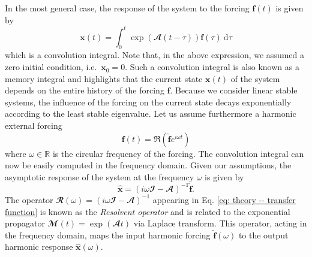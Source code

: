     In the most general case, the response of the system to the forcing $\mathbf{f}(t)$ is given by
    \begin{equation}
      \mathbf{x}(t) = \int_0^t \exp \left( \mathbfcal{A} (t-\tau) \right) \mathbf{f}(\tau) \ \mathrm{d}\tau
      \label{eq: theory -- convolution integral}
    \end{equation}
    which is a convolution integral. Note that, in the above expression, we assumed a zero initial condition, i.e.\ $\mathbf{x}_0 = 0$. Such a convolution integral is also known as a memory integral and highlights that the current state $\mathbf{x}(t)$ of the system depends on the entire history of the forcing $\mathbf{f}$. Because we consider linear stable systems, the influence of the forcing on the current state decays exponentially according to the least stable eigenvalue. Let us assume furthermore a harmonic external forcing
    \begin{equation}
      \mathbf{f}(t) = \Re \left( \hat{\mathbf{f}} e^{i \omega t} \right)
    \end{equation}
    where $\omega \in \mathbb{R}$ is the circular frequency of the forcing. The convolution integral can now be easily computed in the frequency domain. Given our assumptions, the asymptotic response of the system at the frequency $\omega$ is given by
    \begin{equation}
      \hat{\mathbf{x}} = \left( i \omega \mathbfcal{I} - \mathbfcal{A} \right)^{-1} \hat{\mathbf{f}}.
      \label{eq: theory -- transfer function}
    \end{equation}
    The operator $\mathbfcal{R}(\omega) = \left( i \omega \mathbfcal{I} - \mathbfcal{A} \right)^{-1}$ appearing in Eq. \eqref{eq: theory -- transfer function} is known as the \emph{Resolvent operator} and is related to the exponential propagator $\mathbfcal{M}(t) = \exp \left( \mathbfcal{A} t \right)$ via Laplace transform. This operator, acting in the frequency domain, maps the input harmonic forcing $\hat{\mathbf{f}}(\omega)$ to the output harmonic response $\hat{\mathbf{x}}(\omega)$.

